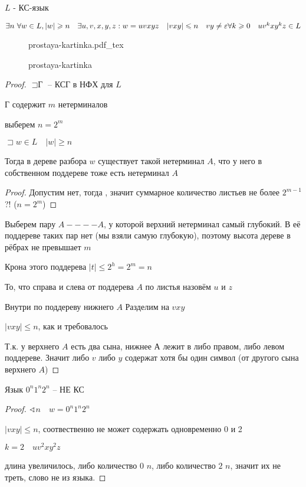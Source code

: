 \documentclass{book}
\theoremstyle{definition}
\newcommand{\incfig}[1]{%
    \def\svgwidth{\columnwidth}
    {#1.pdf_tex}
}
\begin{document}
    \begin{theorem}

        $L$ - КС-язык

         $\exists n\  \forall w\in L, |w| \geqslant n\quad \exists u, v, x, y, z: w = uvxyz\quad |vxy| \leqslant n \quad vy\neq \varepsilon\quad \\ \forall  k\geqslant 0\quad uv^kxy^kz\in L$
    \end{theorem}

\begin{figure}[!ht]
    \centering
    \incfig{prostaya-kartinka}
    \caption{prostaya-kartinka}
    \label{fig:prostaya-kartinka}
\end{figure}


\begin{proof}
    $\sqsupset \text{Г}$ -- КСГ в НФХ для $L$

    Г содержит  $m$ нетерминалов

    выберем  $n = 2^m$

     \begin{lemma}
        $\sqsupset w\in L\quad |w| \geqslant n$

        Тогда в дереве разбора $w$ существует такой нетерминал  $A$, что у него в собственном поддереве тоже есть нетерминал  $A$
    \end{lemma}
    \begin{proof}
        Допустим нет, тогда , значит суммарное количество листьев не более $2^{m-1}$?! ($n = 2^m$) 
    \end{proof}

    Выберем пару $A ---- A$, у которой верхний нетерминал самый глубокий. В её поддереве таких пар нет (мы взяли самую глубокую), поэтому высота дереве в рёбрах не превышает  $m$

    Крона этого поддерева  $|t| \leqslant  2^h = 2^m = n$ 

    То, что справа и слева от поддерева $A$ по листья назовём  $u$ и  $z$

    Внутри по поддереву нижнего  $A$ Разделим на  $vxy$

     $|vxy| \leqslant n$, как и требовалось

     Т.к. у верхнего $A$ есть два сына, нижнее А лежит в либо правом, либо левом поддереве. Значит либо  $v$ либо  $y$ содержат хотя бы один символ (от другого сына верхнего  $A$)
\end{proof}

\begin{theorem}
    Язык $0^n 1^n 2^n$ -- НЕ КС
\end{theorem}
\begin{proof}
    $\sphericalangle n\quad w = 0^n 1^n 2^n$

    $|vxy| \leqslant n$, соотвественно не может содержать одновременно 0 и 2

    $k = 2\quad uv^2xy^2z$

    длина увеличилось, либо количество 0 $n$, либо количество  $2$  $n$, значит их не треть, слово не из языка.
\end{proof}
\end{document}
